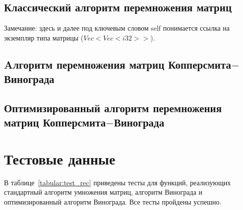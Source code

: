 \subsection{Классический алгоритм перемножения матриц}


Замечание: здесь и далее под ключевым словом self понимается ссылка на экземпляр типа матрицы ($Vec<Vec<i32>>$).
\newpage

\subsection{Aлгоритм перемножения матриц Копперсмита$-$Винограда}


\newpage

\newpage
\subsection{Оптимизированный алгоритм перемножения матриц Копперсмита$-$Винограда}

\newpage

\newpage
\section{Тестовые данные}

В таблице~\ref{tabular:test_rec} приведены тесты для функций, реализующих стандартный алгоритм умножения матриц, алгоритм Винограда и оптимизированный алгоритм Винограда. Все тесты пройдены успешно.

